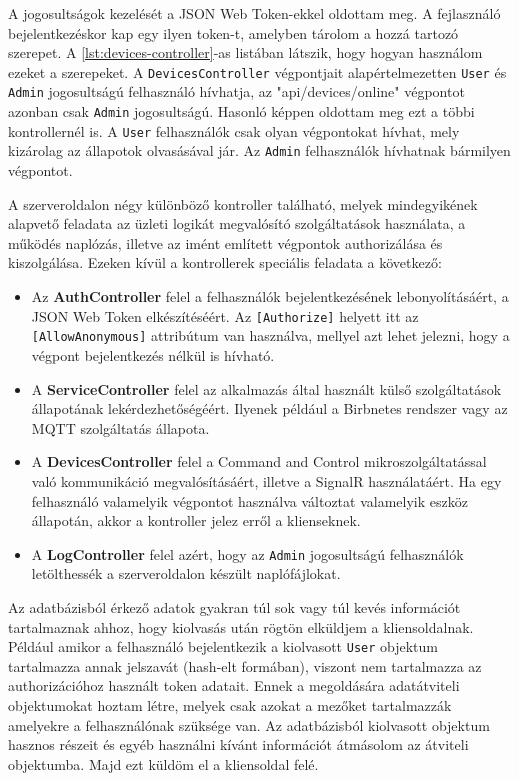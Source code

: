 A jogosultságok kezelését a JSON Web Token-ekkel oldottam meg. A fejlasználó bejelentkezéskor kap egy ilyen token-t, 
amelyben tárolom a hozzá tartozó szerepet. A \ref{lst:devices-controller}-as listában látszik, hogy hogyan használom ezeket a szerepeket.
A \verb+DevicesController+ végpontjait alapértelmezetten \verb+User+ és \verb+Admin+ jogosultságú felhasználó hívhatja, az "api/devices/online" végpontot azonban csak \verb+Admin+ jogosultságú.
Hasonló képpen oldottam meg ezt a többi kontrollernél is. A \verb+User+ felhasználók csak olyan végpontokat hívhat, mely kizárolag az állapotok olvasásával jár.
Az \verb+Admin+ felhasználók hívhatnak bármilyen végpontot.

A szerveroldalon négy különböző kontroller található, melyek mindegyikének alapvető feladata az üzleti logikát megvalósító szolgáltatások használata, a működés naplózás,
illetve az imént említett végpontok authorizálása és kiszolgálása. Ezeken kívül a kontrollerek speciális feladata a következő:
\begin{itemize}
    \item Az \textbf{AuthController} felel a felhasználók bejelentkezésének lebonyolításáért, a JSON Web Token elkészítéséért. Az \verb+[Authorize]+ helyett itt az \verb+[AllowAnonymous]+ attribútum van használva, mellyel azt lehet jelezni, hogy a végpont bejelentkezés nélkül is hívható.
    \item A \textbf{ServiceController} felel az alkalmazás által használt külső szolgáltatások állapotának lekérdezhetőségéért. Ilyenek például a Birbnetes rendszer vagy az MQTT szolgáltatás állapota.
    \item A \textbf{DevicesController} felel a Command and Control mikroszolgáltatással való kommunikáció megvalósításáért, illetve a SignalR használatáért. Ha egy felhasználó valamelyik végpontot használva változtat valamelyik eszköz állapotán, akkor a kontroller jelez erről a klienseknek.
    \item A \textbf{LogController} felel azért, hogy az \verb+Admin+ jogosultságú felhasználók letölthessék a szerveroldalon készült naplófájlokat.
\end{itemize}

Az adatbázisból érkező adatok gyakran túl sok vagy túl kevés információt tartalmaznak ahhoz, hogy kiolvasás után rögtön elküldjem a kliensoldalnak.
Például amikor a felhasználó bejelentkezik a kiolvasott \verb+User+ objektum tartalmazza annak jelszavát (hash-elt formában), viszont nem tartalmazza az authorizációhoz használt token adatait.
Ennek a megoldására adatátviteli objektumokat hoztam létre, melyek csak azokat a mezőket tartalmazzák amelyekre a felhasználónak szüksége van.
Az adatbázisból kiolvasott objektum hasznos részeit és egyéb használni kívánt információt átmásolom az átviteli objektumba. Majd ezt küldöm el a kliensoldal felé.

